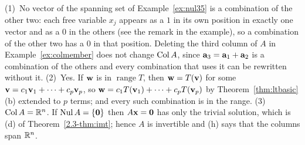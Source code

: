 \documentclass[11pt]{article}
\begin{document}
\begin{description}[leftmargin=0pt,itemsep=5pt]
  \item[Before the next section.] (1)~No vector of the spanning set of Example~\ref{ex:nul35} is a combination of the other two: each free variable $x_j$ appears as a $1$ in its own position in exactly one vector and as a $0$ in the others (see the remark in the example), so a combination of the other two has a $0$ in that position. Deleting the third column of $A$ in Example~\ref{ex:colmember} does not change $\operatorname{Col} A$, since $\mathbf{a}_3=\mathbf{a}_1+\mathbf{a}_2$ is a combination of the others and every combination that uses it can be rewritten without it. (2)~Yes. If $\mathbf{w}$ is in $\operatorname{range}T$, then $\mathbf{w}=T(\mathbf{v})$ for some $\mathbf{v}=c_1\mathbf{v}_1+\cdots+c_p\mathbf{v}_p$, so $\mathbf{w}=c_1T(\mathbf{v}_1)+\cdots+c_pT(\mathbf{v}_p)$ by Theorem~\ref{thm:ltbasic}(b) extended to $p$ terms; and every such combination is in the range. (3)~$\operatorname{Col} A=\mathbb{R}^n$. If $\operatorname{Nul} A=\{\mathbf{0}\}$ then $A\mathbf{x}=\mathbf{0}$ has only the trivial solution, which is (d) of Theorem~\ref{2.3-thm:imt}; hence $A$ is invertible and (h) says that the columns span $\mathbb{R}^n$.
\end{description}
\end{document}
